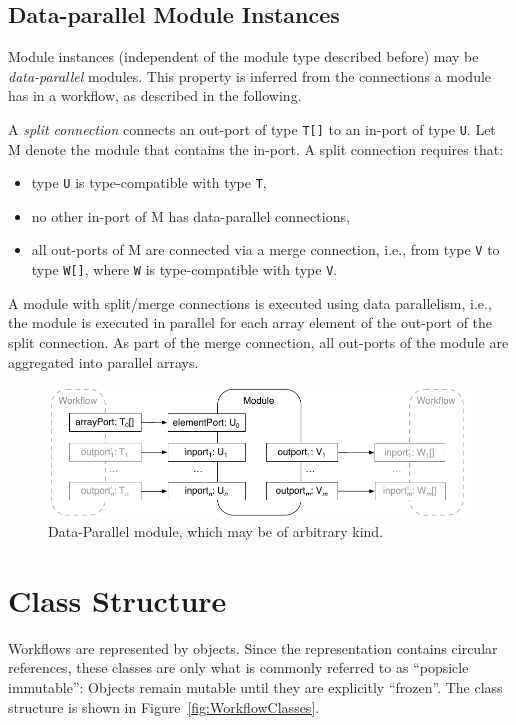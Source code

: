 \subsection{Data-parallel Module Instances}

Module instances (independent of the module type described before) may be \emph{data-parallel} modules. This property is inferred from the connections a module has in a workflow, as described in the following.

A \emph{split connection} connects an out-port of type \texttt{T[]} to an in-port of type \texttt{U}. Let M denote the module that contains the in-port. A split connection requires that:
%
\begin{itemize}
	\item type \texttt U is type-compatible with type \texttt T,
	\item no other in-port of M has data-parallel connections,
	\item all out-ports of M are connected via a merge connection, i.e., from type \texttt V to type \texttt{W[]}, where \texttt W is type-compatible with type \texttt V.
\end{itemize}
%
A module with split/merge connections is executed using data parallelism, i.e., the module is executed in parallel for each array element of the out-port of the split connection. As part of the merge connection, all out-ports of the module are aggregated into parallel arrays.

\begin{figure}
	\centering
	\includegraphics{workflows/data-parallel-module}
	\caption{Data-Parallel module, which may be of arbitrary kind.\label{fig:DataParallelModule}}
\end{figure}

\section{Class Structure} \label{sec:Workflow:ClassStructure}

Workflows are represented by  objects. Since the representation contains circular references, these classes are only what is commonly referred to as ``popsicle immutable'': Objects remain mutable until they are explicitly ``frozen''. 
The class structure is shown in Figure~\ref{fig:WorkflowClasses}.

